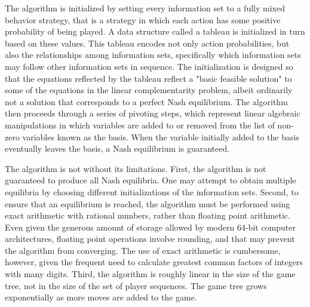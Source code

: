 \documentclass{article}
\begin{document}
The algorithm is initialized by setting every information set to a fully mixed behavior strategy, that is a strategy in which each action has some positive probability of being played. A data structure called a tableau is initialized in turn based on these values. This tableau encodes not only action probabilities, but also the relationships among information sets, specifically which information sets may follow other information sets in sequence. The initialization is designed so that the equations reflected by the tableau reflect a "basic feasible solution" to some of the equations in the linear complementarity problem, albeit ordinarily not a solution that corresponds to a perfect Nash equilibrium.  The algorithm then proceeds through a series of pivoting steps, which represent  linear algebraic manipulations in which variables are added to or removed from the list of non-zero variables known as the basis. When the variable initially added to the basis eventually leaves the basis, a Nash equilibrium is guaranteed.

The algorithm is not without its limitations. First, the algorithm is not guaranteed to produce all Nash equilibria. One may attempt to obtain multiple equilibria by choosing different initializations of the information sets. Second, to ensure that an equilibrium is reached, the algorithm must be performed using exact arithmetic with rational numbers, rather than floating point arithmetic. Even given the generous amount of storage allowed by modern 64-bit computer architectures, floating point operations involve rounding, and that may prevent the algorithm from converging.  The use of exact arithmetic is cumbersome, however, given the frequent need to calculate greatest common factors of integers with many digits. Third, the algorithm is roughly linear in the size of the game tree, not in the size of the set of player sequences. The game tree grows exponentially as more moves are added to the game.

\printbibliography
\end{document}
